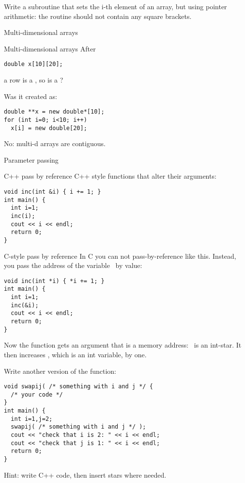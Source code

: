 \begin{exercise}
  Write a subroutine that sets the i-th element of an array, but using
  pointer arithmetic: the routine should not contain any square brackets.
\end{exercise}

 {Multi-dimensional arrays}

\begin{block}{Multi-dimensional arrays}
  \label{sl:static-multi}
After
\begin{verbatim}
double x[10][20];
\end{verbatim}
a row  is a , so is  a ?

Was it created as:
\begin{verbatim}
double **x = new double*[10];
for (int i=0; i<10; i++)
  x[i] = new double[20];
\end{verbatim}
No: multi-d arrays are contiguous.
\end{block}

 {Parameter passing}

\begin{block}{C++ pass by reference}
  \label{sl:cpp-pass-ref}
  C++ style functions that alter their arguments:
\begin{verbatim}
void inc(int &i) { i += 1; }
int main() {
  int i=1;
  inc(i);
  cout << i << endl;
  return 0;
}
\end{verbatim}
\end{block}

\begin{block}{C-style pass by reference}
  \label{sl:c-pass-ref}
  In C you can not pass-by-reference like this. Instead, you pass the
  address of the variable~ by value:
\begin{verbatim}
void inc(int *i) { *i += 1; }
int main() {
  int i=1;
  inc(&i);
  cout << i << endl;
  return 0;
}
\end{verbatim}
Now the function gets an argument that is a memory address: ~is
an int-star. It then increases , which is an int variable, by one.
\end{block}

\begin{exercise}
  \label{ex:c-star-swap}
  Write another version of the  function:
\begin{verbatim}
void swapij( /* something with i and j */ {
  /* your code */
}
int main() {
  int i=1,j=2;
  swapij( /* something with i and j */ );
  cout << "check that i is 2: " << i << endl;
  cout << "check that j is 1: " << i << endl;
  return 0;
}
\end{verbatim}
Hint: write C++ code, then insert stars where needed.
\end{exercise}

